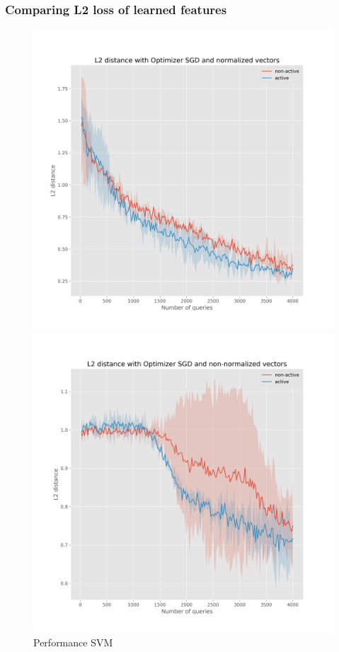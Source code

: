 \documentclass{beamer}
\begin{document}
\begin{frame}{}
    \frametitle{Comparing L2 loss of learned features}
\begin{figure}[!h]
    \centering
    \begin{minipage}{.5\textwidth}
      \centering
      \includegraphics[width=\linewidth]{active-vs-base-moons-l2-loss-SGD-normalized-ci}
    \end{minipage}%
    \begin{minipage}{.5\textwidth}
      \centering
      \includegraphics[width=\linewidth]{active-vs-base-moons-l2-loss-SGD-non-normalized-ci}
    \end{minipage}
    \caption{Performance SVM}
  \end{figure}
\end{frame}
\end{document}
